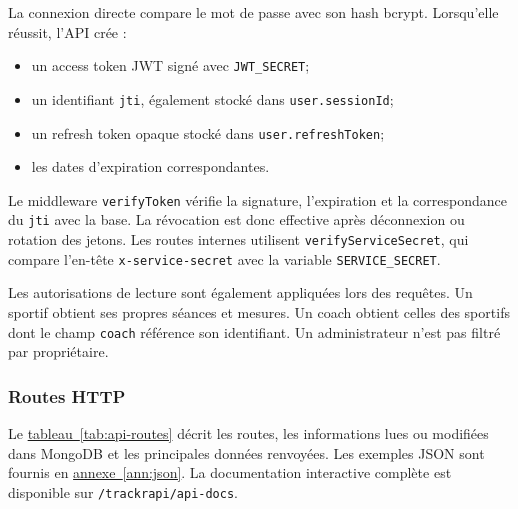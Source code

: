 \documentclass[11pt,a4paper]{article}
\newcommand{\code}[1]{\nolinkurl{#1}}
\newcommand{\tabref}[1]{\hyperref[#1]{tableau~\ref*{#1}}}
\newcommand{\annref}[1]{\hyperref[#1]{annexe~\ref*{#1}}}
\begin{document}
La connexion directe compare le mot de passe avec son hash bcrypt. Lorsqu'elle réussit, l'API crée :

\begin{itemize}
  \item un access token JWT signé avec \code{JWT_SECRET};
  \item un identifiant \code{jti}, également stocké dans \code{user.sessionId};
  \item un refresh token opaque stocké dans \code{user.refreshToken};
  \item les dates d'expiration correspondantes.
\end{itemize}

Le middleware \code{verifyToken} vérifie la signature, l'expiration et la correspondance du \code{jti} avec la base. La révocation est donc effective après déconnexion ou rotation des jetons. Les routes internes utilisent \code{verifyServiceSecret}, qui compare l'en-tête \code{x-service-secret} avec la variable \code{SERVICE_SECRET}.

Les autorisations de lecture sont également appliquées lors des requêtes. Un sportif obtient ses propres séances et mesures. Un coach obtient celles des sportifs dont le champ \code{coach} référence son identifiant. Un administrateur n'est pas filtré par propriétaire.

\subsubsection{Routes HTTP}

Le \tabref{tab:api-routes} décrit les routes, les informations lues ou modifiées dans MongoDB et les principales données renvoyées. Les exemples JSON sont fournis en \annref{ann:json}. La documentation interactive complète est disponible sur \code{/trackrapi/api-docs}.
\end{document}
